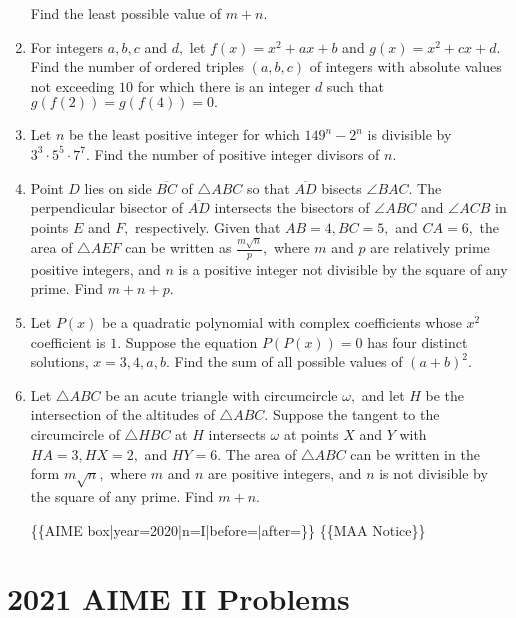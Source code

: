 \documentclass{article}
\begin{document}
\begin{enumerate}[label=\arabic*., itemsep=0.5em]
Find the least possible value of \(m+n.\)\par \vspace{0.5em}\item For integers \(a,b,c\) and \(d,\) let \(f(x)=x^2+ax+b\) and \(g(x)=x^2+cx+d.\) Find the number of ordered triples \((a,b,c)\) of integers with absolute values not exceeding \(10\) for which there is an integer \(d\) such that \(g(f(2))=g(f(4))=0.\)\par \vspace{0.5em}\item Let \(n\) be the least positive integer for which \(149^n-2^n\) is divisible by \(3^3\cdot5^5\cdot7^7.\) Find the number of positive integer divisors of \(n.\)\par \vspace{0.5em}\item Point \(D\) lies on side \(\overline{BC}\) of \(\triangle ABC\) so that \(\overline{AD}\) bisects \(\angle BAC.\) The perpendicular bisector of \(\overline{AD}\) intersects the bisectors of \(\angle ABC\) and \(\angle ACB\) in points \(E\) and \(F,\) respectively. Given that \(AB=4,BC=5,\) and \(CA=6,\) the area of \(\triangle AEF\) can be written as \(\tfrac{m\sqrt{n}}p,\) where \(m\) and \(p\) are relatively prime positive integers, and \(n\) is a positive integer not divisible by the square of any prime. Find \(m+n+p\).\par \vspace{0.5em}\item Let \(P(x)\) be a quadratic polynomial with complex coefficients whose \(x^2\) coefficient is \(1.\) Suppose the equation \(P(P(x))=0\) has four distinct solutions, \(x=3,4,a,b.\) Find the sum of all possible values of \((a+b)^2.\)\par \vspace{0.5em}\item Let \(\triangle ABC\) be an acute triangle with circumcircle \(\omega,\) and let \(H\) be the intersection of the altitudes of \(\triangle ABC.\) Suppose the tangent to the circumcircle of \(\triangle HBC\) at \(H\) intersects \(\omega\) at points \(X\) and \(Y\) with \(HA=3,HX=2,\) and \(HY=6.\) The area of \(\triangle ABC\) can be written in the form \(m\sqrt{n},\) where \(m\) and \(n\) are positive integers, and \(n\) is not divisible by the square of any prime. Find \(m+n.\)




\{\{AIME box|year=2020|n=I|before=|after=\}\}
\{\{MAA Notice\}\}\par \vspace{0.5em}
\end{enumerate}
\newpage\section*{2021 AIME II Problems}
\end{document}
